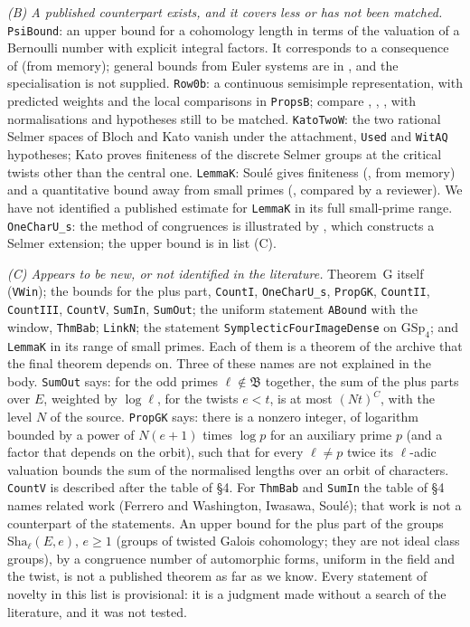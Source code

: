 \documentclass[11pt,letterpaper]{article}
\begin{document}
\emph{(B) A published counterpart exists, and it covers less or has not been matched.}
\texttt{PsiBound}: an upper bound for a cohomology length in terms of the valuation of a Bernoulli number
with explicit integral factors. It corresponds to a consequence of \cite{MW84} (from memory); general bounds
from Euler systems are in \cite[\S2.2]{Rub00}, and the specialisation is not supplied.
\texttt{Row0b}: a continuous semisimple representation, with predicted weights and the local comparisons in
\texttt{PropsB}; compare \cite{CH13}, \cite{Car12}, \cite[Thm.~1.1]{Car14}, with normalisations and
hypotheses still to be matched. \texttt{KatoTwoW}: the two rational Selmer spaces of Bloch and Kato vanish
under the attachment, \texttt{Used} and \texttt{WitAQ} hypotheses; Kato \cite[\S14.1, Thm.~14.2(1)]{Kat04}
proves finiteness of the discrete Selmer groups at the critical twists other than the central one.
\texttt{LemmaK}: Soul\'e gives finiteness (\cite{Sou79}, from memory) and a quantitative bound away from
small primes (\cite[Thms.~2 and~3]{Sou03}, compared by a reviewer). We have not identified a published estimate for
\texttt{LemmaK} in its full small-prime range. \texttt{OneCharU\_s}: the method of congruences is illustrated
by \cite[Thm.~1.1]{BC04}, which constructs a Selmer extension; the upper bound is in list (C).

\emph{(C) Appears to be new, or not identified in the literature.} Theorem~G itself (\texttt{VWin}); the
bounds for the plus
part, \texttt{CountI}, \texttt{OneCharU\_s}, \texttt{PropGK}, \texttt{CountII}, \texttt{CountIII},
\texttt{CountV}, \texttt{SumIn}, \texttt{SumOut}; the uniform statement \texttt{ABound} with the window,
\texttt{ThmBab}; \texttt{LinkN}; the statement \texttt{SymplecticFourImageDense} on $\mathrm{GSp}_4$; and
\texttt{LemmaK} in its range of small primes. Each of them is a theorem
of the archive that the final theorem depends on. Three of these names are not explained in the body.
\texttt{SumOut} says: for the odd primes $\ell\notin\mathfrak B$ together, the sum of the plus parts over
$E$, weighted by $\log\ell$, for the twists $e<t$, is at most $(Nt)^{C}$, with the level $N$ of the source. \texttt{PropGK} says: there is a
nonzero integer, of logarithm bounded by a power of $N(e+1)$ times $\log p$ for an auxiliary prime $p$ (and a factor that depends on the orbit), such
that for every $\ell\ne p$ twice its $\ell$-adic valuation bounds the sum of the normalised lengths over an
orbit of characters. \texttt{CountV} is described after the table of \S4. For \texttt{ThmBab} and
\texttt{SumIn} the table of \S4 names related work (Ferrero and Washington, Iwasawa, Soul\'e); that work is
not a counterpart of the statements. An upper bound for the plus part of the groups $\mathrm{Sha}_\ell(E,e)$, $e\ge1$ (groups of twisted
Galois cohomology; they are not ideal class groups), by a
congruence number of automorphic forms, uniform in the field and the twist, is not a published theorem as
far as we know. Every statement of novelty in this list is provisional: it is a judgment made without a
search of the literature, and it was not tested.
\end{document}
